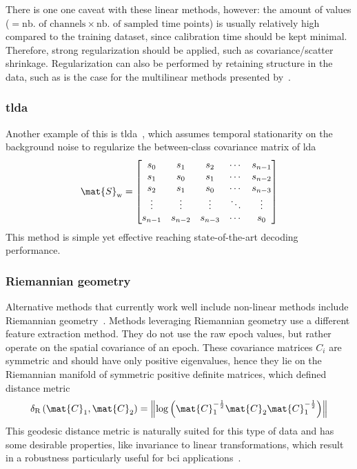 There is one one caveat with these linear methods, however:
the amount of values ($=\text{nb. of channels}\times\text{nb. of sampled time points}$)
is usually relatively high compared to the training dataset, since calibration
time should be kept minimal.
Therefore, strong regularization should be applied, such as covariance/scatter
shrinkage.
Regularization can also be performed by retaining structure in the data, such
as is the case for the multilinear methods presented by~\textcite{Lotte2018}.

\subsubsection{\Ac{tlda}}

Another example of this is \ac{tlda}~\cite{Sosulski2022}, which assumes temporal
stationarity on the background noise to regularize the between-class covariance
matrix of \ac{lda}
\begin{equation}
  \mat{S}_\text{w} = \begin{bmatrix}
s_0 & s_1 & s_2 & \cdots & s_{n-1} \\
s_1 & s_0 & s_1 & \cdots & s_{n-2} \\
s_2 & s_1 & s_0 & \cdots & s_{n-3} \\
\vdots & \vdots & \vdots & \ddots & \vdots \\
s_{n-1} & s_{n-2} & s_{n-3} & \cdots & s_0
\end{bmatrix}
\end{equation}
This method is simple yet effective reaching state-of-the-art decoding
performance.


\subsubsection{Riemannian geometry}

Alternative methods that currently work well include
non-linear methods include Riemannian geometry~\cite{Barachant2014}.
Methods leveraging Riemannian geometry use a different feature extraction
method.
They do not use the raw epoch values, but rather operate on the spatial
covariance of an epoch.
These covariance matrices $C_i$ are symmetric and should have only positive
eigenvalues, hence they lie on the Riemannian manifold of symmetric positive
definite matrices, which defined distance metric
\begin{equation}
  \delta_\text{R}\left(\mat{C}_1,\mat{C}_2\right)
  =\left\lVert\log\left(\mat{C}_1^{-\frac{1}{2}} \mat{C}_2 \mat{C}_1^{-\frac{1}{2}}\right)\right\rVert
\end{equation}
This geodesic distance metric is naturally suited for this type of data and has
some desirable properties, like invariance to linear transformations, which
result in a robustness particularly useful for \ac{bci}
applications~\cite{Barachant2011}.

